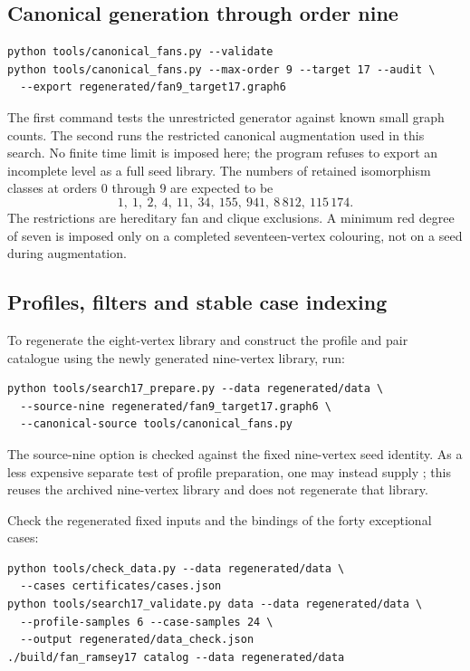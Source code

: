 \documentclass[11pt]{article}
\newcommand{\file}[1]{\path{#1}}
\begin{document}
\subsection{Canonical generation through order nine}
\begingroup\footnotesize
\begin{verbatim}
python tools/canonical_fans.py --validate
python tools/canonical_fans.py --max-order 9 --target 17 --audit \
  --export regenerated/fan9_target17.graph6
\end{verbatim}
\endgroup
The first command tests the unrestricted generator against known small
graph counts. The second runs the restricted canonical augmentation
used in this search. No finite time limit is imposed here; the program
refuses to export an incomplete level as a full seed library.
The numbers of retained isomorphism classes at orders $0$ through $9$
are expected to be
\[
1,\ 1,\ 2,\ 4,\ 11,\ 34,\ 155,\ 941,\ 8\,812,\ 115\,174.
\]
The restrictions are hereditary fan and clique exclusions. A minimum
red degree of seven is imposed only on a completed seventeen-vertex
colouring, not on a seed during augmentation.

\subsection{Profiles, filters and stable case indexing}
To regenerate the eight-vertex library and construct the profile and
pair catalogue using the newly generated nine-vertex library, run:
\begingroup\footnotesize
\begin{verbatim}
python tools/search17_prepare.py --data regenerated/data \
  --source-nine regenerated/fan9_target17.graph6 \
  --canonical-source tools/canonical_fans.py
\end{verbatim}
\endgroup
The source-nine option is checked against the fixed nine-vertex seed
identity. As a less expensive separate test of profile preparation,
one may instead supply \file{data/fan9_target17.graph6}; this reuses the
archived nine-vertex library and does not regenerate that library.

Check the regenerated fixed inputs and the bindings of the forty
exceptional cases:
\begingroup\footnotesize
\begin{verbatim}
python tools/check_data.py --data regenerated/data \
  --cases certificates/cases.json
python tools/search17_validate.py data --data regenerated/data \
  --profile-samples 6 --case-samples 24 \
  --output regenerated/data_check.json
./build/fan_ramsey17 catalog --data regenerated/data
\end{verbatim}
\endgroup
\end{document}
